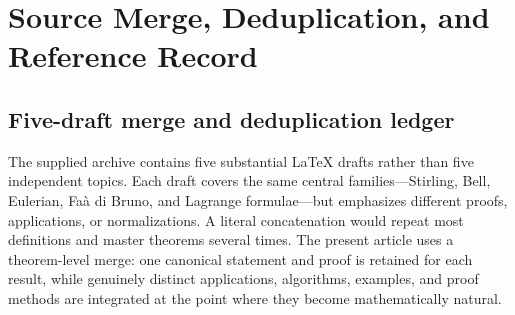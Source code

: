 \documentclass[11pt,a4paper,oneside,openany]{book}
\theoremstyle{definition}
\theoremstyle{remark}
\begin{document}
\part{Source Merge, Deduplication, and Reference Record}
\label{part:source-record}

\chapter{Five-draft merge and deduplication ledger}
\label{ch:merge-ledger}

The supplied archive contains five substantial LaTeX drafts rather than five
independent topics.  Each draft covers the same central families---Stirling,
Bell, Eulerian, Faà di Bruno, and Lagrange formulae---but emphasizes different
proofs, applications, or normalizations.  A literal concatenation would repeat
most definitions and master theorems several times.  The present article uses a
theorem-level merge: one canonical statement and proof is retained for each
result, while genuinely distinct applications, algorithms, examples, and proof
methods are integrated at the point where they become mathematically natural.
\end{document}
